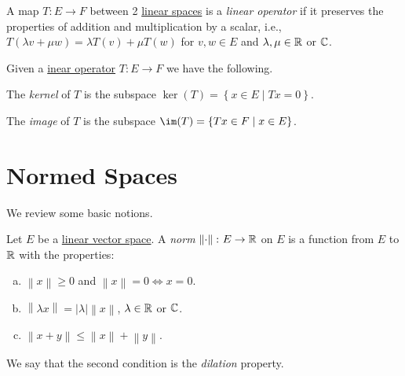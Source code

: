 \begin{definition}\label{def:linear-operator}
	A map \(T\colon E\to F\) between 2 \hyperref[def:linear-vector-space]{linear spaces} is a \emph{linear operator} if it preserves the properties of addition and multiplication by a scalar, i.e., \(T(\lambda v + \mu w) = \lambda T(v) + \mu T(w)\) for \(v, w\in E\) and \(\lambda , \mu \in \mathbb{\MakeUppercase{r}}\) or \(\mathbb{\MakeUppercase{c}}\).
\end{definition}

\begin{definition*}
	Given a \hyperref[def:linear-operator]{inear operator} \(T\colon E \to F\) we have the following.
	\begin{definition}[Kernel]
		The \emph{kernel} of \(T\) is the subspace \(\ker(T) = \left\{ x\in E\mid Tx=0 \right\} \).
	\end{definition}

	\begin{definition}[Image]
		The \emph{image} of \(T\) is the subspace \(\im(T) = \left\{ Tx\in F\mid x\in E \right\} \).
	\end{definition}
\end{definition*}

\section{Normed Spaces}
We review some basic notions.

\begin{definition}[Norm]\label{def:norm}
	Let \(E\) be a \hyperref[def:linear-vector-space]{linear vector space}. A \emph{norm} \(\left\lVert \cdot \right\rVert \colon E \to \mathbb{\MakeUppercase{r}} \) on \(E\) is a function from \(E\) to \(\mathbb{\MakeUppercase{r}} \) with the properties:
	\begin{enumerate}[(a)]
		\item \(\left\lVert x\right\rVert \geq 0\) and \(\left\lVert x\right\rVert =0 \iff x=0\).
		\item \(\left\lVert \lambda x\right\rVert = \left\vert \lambda  \right\vert \left\lVert x\right\rVert\), \(\lambda \in\mathbb{\MakeUppercase{r}} \) or \(\mathbb{\MakeUppercase{c}} \).
		\item \(\left\lVert x+y\right\rVert \leq \left\lVert x\right\rVert + \left\lVert y\right\rVert \).
	\end{enumerate}
\end{definition}

\begin{notation}[Dilation]
	We say that the second condition is the \emph{dilation} property.
\end{notation}

